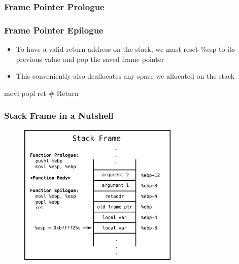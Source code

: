 \documentclass[11pt,xcolor=dvipsnames]{beamer}
\newcommand{\mvs}{\vspace{-0.95em}}
\begin{document}
\begin{frame}[fragile,t]
\frametitle{Frame Pointer Prologue}
\mvs
{}
\end{frame}

\begin{frame}[fragile,t]
\frametitle{Frame Pointer Epilogue}
\begin{itemize}
  \item To have a valid return address on the stack, we must reset {\ttfamily \%esp} to its previous value and pop the saved frame pointer
  \item This conveniently also deallocates any space we allocated on the stack
\end{itemize}
\begin{gascode}
    movl %
    popl %
    ret               # Return
\end{gascode}
\end{frame}

\begin{frame}[fragile]
\frametitle{Stack Frame in a Nutshell}
\mvs
\begin{figure}
\centering
\includegraphics[width=0.68\textwidth]{figures/stackframe.png}
\end{figure}
\end{frame}
\end{document}
